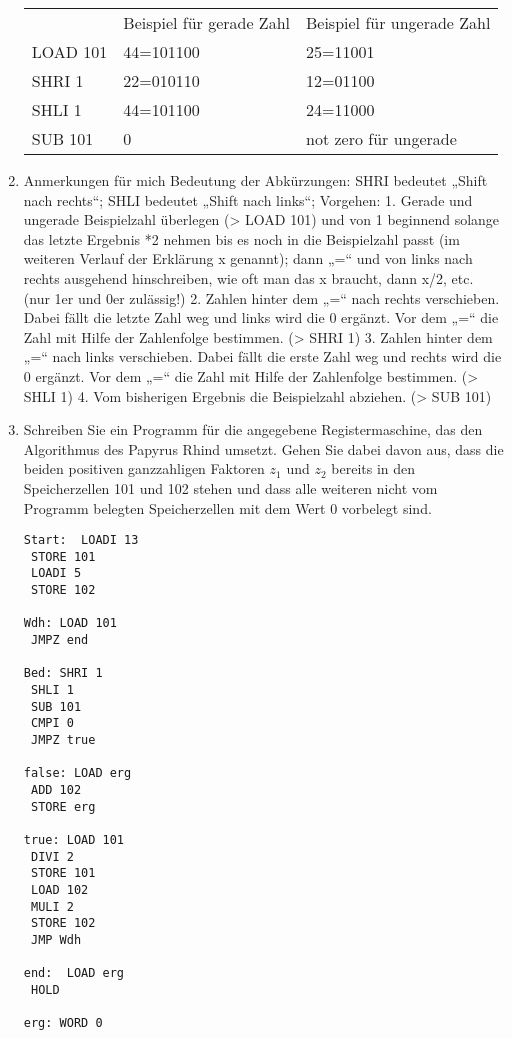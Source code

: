 \documentclass{lehramt-informatik-aufgabe}
\begin{document}
\begin{enumerate}
\begin{tabular}{lll}
         & Beispiel für gerade    Zahl & Beispiel für ungerade    Zahl \\
LOAD 101 & 44=101100                   & 25=11001                      \\
SHRI 1   & 22=010110                   & 12=01100                      \\
SHLI 1   & 44=101100                   & 24=11000                      \\
SUB 101  & 0                           & not zero    für ungerade
\end{tabular}

\item Anmerkungen für mich
Bedeutung der Abkürzungen:
SHRI bedeutet „Shift nach rechts“; SHLI bedeutet „Shift nach links“;
Vorgehen:
1. Gerade und ungerade Beispielzahl überlegen (> LOAD 101) und von 1 beginnend solange das letzte Ergebnis *2 nehmen bis es noch in die Beispielzahl passt (im weiteren Verlauf der Erklärung x genannt); dann „=“ und von links nach rechts ausgehend hinschreiben, wie oft man das x braucht, dann x/2, etc. (nur 1er und 0er zulässig!)
2. Zahlen hinter dem „=“ nach rechts verschieben. Dabei fällt die letzte Zahl weg und links wird die 0 ergänzt. Vor dem „=“ die Zahl mit Hilfe der Zahlenfolge bestimmen. (> SHRI 1)
3. Zahlen hinter dem „=“ nach links verschieben. Dabei fällt die erste Zahl weg und rechts wird die 0 ergänzt. Vor dem „=“ die Zahl mit Hilfe der Zahlenfolge bestimmen. (> SHLI 1)
4. Vom bisherigen Ergebnis die Beispielzahl abziehen. (> SUB 101)

\item Schreiben Sie ein Programm für die angegebene Registermaschine,
das den Algorithmus des Papyrus Rhind umsetzt. Gehen Sie dabei davon
aus, dass die beiden positiven ganzzahligen Faktoren $z_1$ und $z_2$
bereits in den Speicherzellen 101 und 102 stehen und dass alle weiteren
nicht vom Programm belegten Speicherzellen mit dem Wert 0 vorbelegt
sind.

\begin{verbatim}
Start:  LOADI 13
 STORE 101
 LOADI 5
 STORE 102

Wdh: LOAD 101
 JMPZ end

Bed: SHRI 1
 SHLI 1
 SUB 101
 CMPI 0
 JMPZ true

false: LOAD erg
 ADD 102
 STORE erg

true: LOAD 101
 DIVI 2
 STORE 101
 LOAD 102
 MULI 2
 STORE 102
 JMP Wdh

end:  LOAD erg
 HOLD

erg: WORD 0
\end{verbatim}

\end{enumerate}
\end{document}
